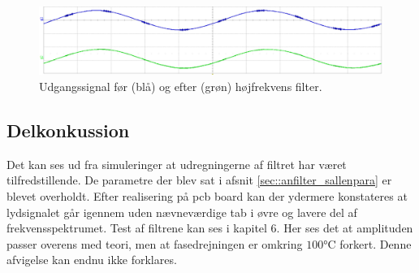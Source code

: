 \begin{figure}[h!]
	\centering
	\includegraphics[scale = 0.55]{./billeder/hf.png}
	\caption{Udgangssignal før (blå) og efter (grøn) højfrekvens filter.}
	\label{fig::anfilter_hf}
\end{figure}
\FloatBlock

\subsection{Delkonkussion}
Det kan ses ud fra simuleringer at udregningerne af filtret har været tilfredstillende. De parametre der blev sat i afsnit \ref{sec::anfilter_sallenpara} er blevet overholdt. Efter realisering på pcb board kan der  ydermere konstateres at lydsignalet går igennem uden nævneværdige tab i øvre og lavere del af frekvensspektrumet. Test af filtrene kan ses i kapitel 6. Her ses det at amplituden passer overens med teori, men at fasedrejningen er omkring $100 \si{\celsius}$ forkert. Denne afvigelse kan endnu ikke forklares.